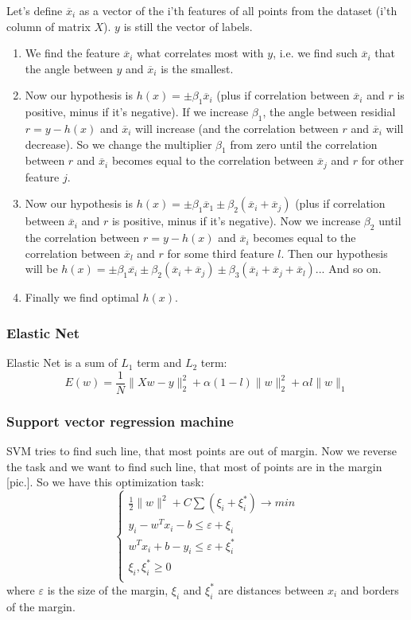 Let's define $\overline{x}_i$ as a vector of the i'th features of all points from the dataset (i'th column of matrix $X$). $y$ is still the vector of labels.
\begin{enumerate}
	\item We find the feature $\overline{x}_i$ what correlates most with $y$, i.e. we find such $\overline{x}_i$ that the angle between $y$ and $\overline{x}_i$ is the smallest.
	\item Now our hypothesis is $h(x)=\pm\beta_1\overline{x}_i$ (plus if correlation between $\overline{x}_i$ and $r$ is positive, minus if it's negative). If we increase $\beta_1$, the angle between residial $r=y-h(x)$ and $\overline{x}_i$ will increase (and  the correlation between $r$ and $\overline{x}_i$ will decrease). So we change the multiplier $\beta_1$ from zero until the correlation between $r$ and $\overline{x}_i$ becomes equal to the correlation between $\overline{x}_j$ and $r$ for other feature $j$.
	\item Now our hypothesis is $h(x)=\pm\beta_1\overline{x}_1\pm\beta_2(\overline{x}_i+\overline{x}_j)$ (plus if correlation between $\overline{x}_i$ and $r$ is positive, minus if it's negative). Now we increase $\beta_2$ until the correlation between $r=y-h(x)$ and $\overline{x}_i$ becomes equal to the correlation between $\overline{x}_l$ and $r$ for some third feature $l$. Then our hypothesis will be $h(x)=\pm\beta_1\overline{x_i}\pm\beta_2(\overline{x}_i+\overline{x}_j)\pm\beta_3(\overline{x}_i+\overline{x}_j+\overline{x}_l)$... And so on.
	\item Finally we find optimal $h(x)$.
\end{enumerate}

\subsubsection*{Elastic Net}

Elastic Net is a sum of $L_1$ term and $L_2$ term:
$$E(w)=\frac{1}{N}\|Xw-y\|_2^2+\alpha(1-l)\|w\|_2^2+\alpha l\|w\|_1$$

\subsubsection*{Support vector regression machine}

SVM tries to find such line, that most points are out of margin. Now we reverse the task and we want to find such line, that most of points are in the margin [pic.]. So we have this optimization task:
$$\begin{cases}
	\frac{1}{2}\|w\|^2+C\sum(\xi_i+\xi_i^*)\to min \\
	y_i-w^Tx_i-b\le\varepsilon+\xi_i \\
	w^Tx_i+b-y_i\le\varepsilon+\xi_i^* \\
	\xi_i,\xi_i^* \ge 0 \\
\end{cases}$$
where $\varepsilon$ is the size of the margin, $\xi_i$ and $\xi_i^*$ are distances between $x_i$ and borders of the margin.

